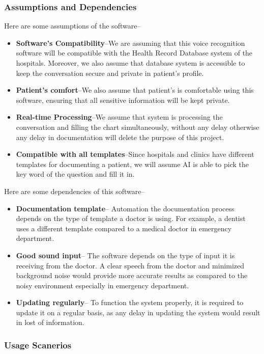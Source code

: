 \documentclass[12pt]{article}
\begin{document}
\subsubsection{Assumptions and Dependencies} \label{sec_assumpt}
Here are some assumptions of the software--

\begin{itemize}
  \item\textbf{Software's Compatibility}--We are assuming that this voice recognition software will be compatible with the Health Record Database system of the hospitals. Moreover, we also assume that database system is accessible to keep the conversation secure and private in patient’s profile.
  \item\textbf{Patient's comfort}--We also assume that patient’s is comfortable using this software, ensuring that all sensitive information will be kept private.
  \item\textbf{Real-time Processing}--We assume that system is processing the conversation and filling the chart simultaneously, without any delay otherwise any delay in documentation will delete the purpose of this project.
  \item\textbf{Compatible with all templates}--Since hospitals and clinics have different templates for documenting a patient, we will assume AI is able to pick the key word of the question and fill it in.
\end{itemize}

Here are some dependencies of this software--

\begin{itemize}
  \item\textbf{Documentation template}-- Automation the documentation process depends on the type of template a doctor is using. For example, a dentist uses a different template compared to a medical doctor in emergency department.
  \item\textbf{Good sound input}-- The software depends on the type of input it is receiving from the doctor. A clear speech from the doctor and minimized background noise would provide more accurate results as compared to the noisy environment especially in emergency department.
  \item\textbf{Updating regularly}-- To function the system properly, it is required to update it on a regular basis, as any delay in updating the system would result in lost of information.
\end{itemize}


\subsubsection{Usage Scanerios}
\end{document}
